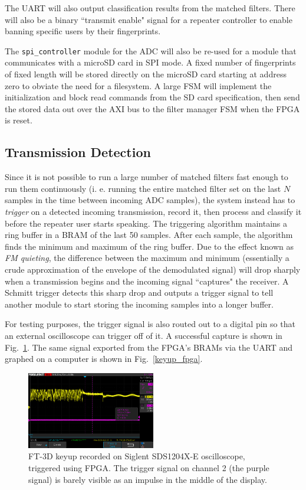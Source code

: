 \documentclass[conference]{IEEEtran}
\begin{document}
The UART will also output classification results from the matched filters. There will also be a binary ``transmit enable" signal for a repeater controller to enable banning specific users by their fingerprints.

The \lstinline{spi_controller} module for the ADC will also be re-used for a module that communicates with a microSD card in SPI mode. A fixed number of fingerprints of fixed length will be stored directly on the microSD card starting at address zero to obviate the need for a filesystem. A large FSM will implement the initialization and block read commands from the SD card specification, then send the stored data out over the AXI bus to the filter manager FSM when the FPGA is reset.

\subsection{Transmission Detection}

Since it is not possible to run a large number of matched filters fast enough to run them continuously (i. e. running the entire matched filter set on the last $ N $ samples in the time between incoming ADC samples), the system instead has to \emph{trigger} on a detected incoming transmission, record it, then process and classify it before the repeater user starts speaking. The triggering algorithm maintains a ring buffer in a BRAM of the last 50 samples. After each sample, the algorithm finds the minimum and maximum of the ring buffer. Due to the effect known as \emph{FM quieting}, the difference between the maximum and minimum (essentially a crude approximation of the envelope of the demodulated signal) will drop sharply when a transmission begins and the incoming signal ``captures" the receiver. A Schmitt trigger detects this sharp drop and outputs a trigger signal to tell another module to start storing the incoming samples into a longer buffer.

For testing purposes, the trigger signal is also routed out to a digital pin so that an external oscilloscope can trigger off of it. A successful capture is shown in Fig.~\ref{keyup_oscilloscope}. The same signal exported from the FPGA's BRAMs via the UART and graphed on a computer is shown in Fig.~\ref{keyup_fpga}.

\begin{figure}
    \centerline{\includegraphics[width=0.5\textwidth]{First_Working_Capture_Oscilloscope.png}}
    \caption{FT-3D keyup recorded on Siglent SDS1204X-E oscilloscope, triggered using FPGA. The trigger signal on channel 2 (the purple signal) is barely visible as an impulse in the middle of the display.}
    \label{keyup_oscilloscope}
\end{figure}
\end{document}
